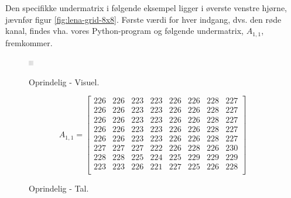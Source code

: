 Den specifikke undermatrix i følgende eksempel ligger i øverste venstre hjørne, jævnfør figur \vref{fig:lena-grid-8x8}. Første værdi for hver indgang, dvs. den røde kanal, findes vha. vores Python-program og følgende undermatrix, $A_{1,1}$, fremkommer.
\begin{figure}[!h]
\begin{minipage}[b]{0.27\linewidth}
\centering
\includegraphics[width=\textwidth]{Billeder/LenaAnvendelse/RED8x8/lena1-R8x8-org.png}
\caption{Oprindelig - Visuel.}
\label{fig:lena1-R8x8-org-visuel}
\end{minipage}
\hspace{0.5cm}
\begin{minipage}[b]{0.45\linewidth}
\centering
\[A_{1,1}=\begin{bmatrix}
226 & 226 & 223 & 223 & 226 & 226 & 228 & 227 \\
226 & 226 & 223 & 223 & 226 & 226 & 228 & 227 \\
226 & 226 & 223 & 223 & 226 & 226 & 228 & 227 \\
226 & 226 & 223 & 223 & 226 & 226 & 228 & 227 \\
226 & 226 & 223 & 223 & 226 & 226 & 228 & 227 \\
227 & 227 & 227 & 222 & 226 & 228 & 226 & 230 \\
228 & 228 & 225 & 224 & 225 & 229 & 229 & 229 \\
223 & 223 & 226 & 221 & 227 & 225 & 226 & 228 \\
\end{bmatrix}\]
\caption{Oprindelig - Tal.}
\label{fig:lena1-R8x8-org-matrix}
\end{minipage}
\end{figure}
